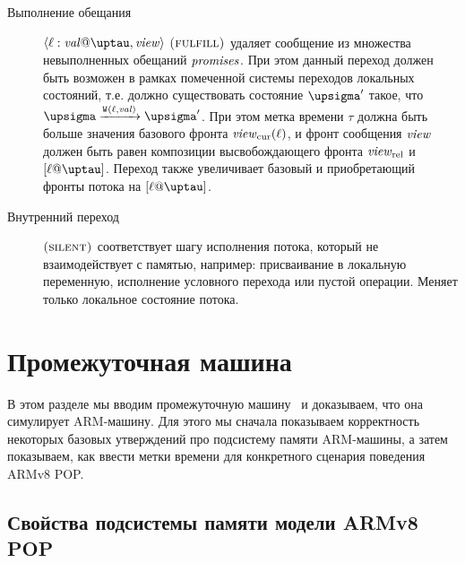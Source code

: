 \begin{description}
  \item[Выполнение обещания] $\writeEvt{\loc}{\stval}{\tau}{\R}$ $\textsc{(fulfill)}$ удаляет сообщение из множества
    невыполненных обещаний $\mathit{promises}$. При этом данный переход должен быть возможен в
    рамках помеченной системы переходов локальных состояний, т.е. должно существовать
    состояние $\pstate'$ такое, что $\pstate \xrightarrow{\wlab{}{\loc}{\stval}} \pstate'$.
    При этом метка времени $\tau$ должна быть больше значения базового фронта $\mathit{view}_{\mathrm{cur}}(\ell)$,
    и фронт сообщения $\mathit{view}$ должен быть равен композиции высвобождающего фронта $\mathit{view}_{\mathrm{rel}}$
    и $[\loc@\tau]$. Переход также увеличивает базовый и приобретающий фронты потока на $[\loc@\tau]$.

  \item[Внутренний переход] $\textsc{(silent)}$ соответствует шагу исполнения потока, который не взаимодействует
    с памятью, например: присваивание в локальную переменную, исполнение условного перехода или пустой операции.
    Меняет только локальное состояние потока.
\end{description}

\section{Промежуточная машина \ARMt}
В этом разделе мы вводим промежуточную машину \ARMt~и доказываем, что она симулирует
ARM-машину.
Для этого мы сначала показываем корректность некоторых базовых утверждений
про подсистему памяти ARM-машины,
а затем показываем, как ввести метки времени для конкретного сценария поведения ARMv8 POP.

\subsection{Свойства подсистемы памяти модели ARMv8 POP}

